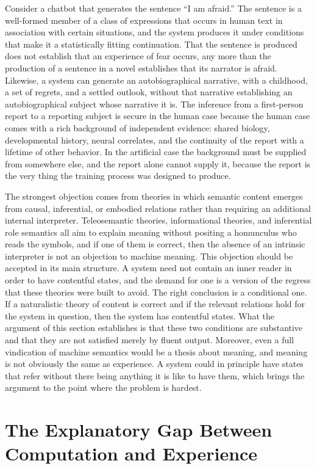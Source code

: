 \documentclass[12pt]{article}
\theoremstyle{definition}
\begin{document}
Consider a chatbot that generates the sentence ``I am afraid.'' The sentence is a well-formed member of a class of expressions that occurs in human text in association with certain situations, and the system produces it under conditions that make it a statistically fitting continuation. That the sentence is produced does not establish that an experience of fear occurs, any more than the production of a sentence in a novel establishes that its narrator is afraid. Likewise, a system can generate an autobiographical narrative, with a childhood, a set of regrets, and a settled outlook, without that narrative establishing an autobiographical subject whose narrative it is. The inference from a first-person report to a reporting subject is secure in the human case because the human case comes with a rich background of independent evidence: shared biology, developmental history, neural correlates, and the continuity of the report with a lifetime of other behavior. In the artificial case the background must be supplied from somewhere else, and the report alone cannot supply it, because the report is the very thing the training process was designed to produce.

The strongest objection comes from theories in which semantic content emerges from causal, inferential, or embodied relations rather than requiring an additional internal interpreter. Teleosemantic theories, informational theories, and inferential role semantics all aim to explain meaning without positing a homunculus who reads the symbols, and if one of them is correct, then the absence of an intrinsic interpreter is not an objection to machine meaning. This objection should be accepted in its main structure. A system need not contain an inner reader in order to have contentful states, and the demand for one is a version of the regress that these theories were built to avoid. The right conclusion is a conditional one. If a naturalistic theory of content is correct and if the relevant relations hold for the system in question, then the system has contentful states. What the argument of this section establishes is that these two conditions are substantive and that they are not satisfied merely by fluent output. Moreover, even a full vindication of machine semantics would be a thesis about meaning, and meaning is not obviously the same as experience. A system could in principle have states that refer without there being anything it is like to have them, which brings the argument to the point where the problem is hardest.

\section{The Explanatory Gap Between Computation and Experience}
\label{sec:gap}
\end{document}
